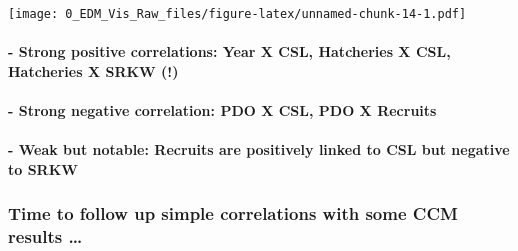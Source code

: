 \documentclass[]{article}
\let\oldparagraph\paragraph
\renewcommand{\paragraph}[1]{\oldparagraph{#1}\mbox{}}
\begin{document}
\texttt{[image: 0\_EDM\_Vis\_Raw\_files/figure-latex/unnamed-chunk-14-1.pdf]}

\hypertarget{strong-positive-correlations-year-x-csl-hatcheries-x-csl-hatcheries-x-srkw}{%
\paragraph{- Strong positive correlations: Year X CSL, Hatcheries X CSL,
Hatcheries X SRKW
(!)}\label{strong-positive-correlations-year-x-csl-hatcheries-x-csl-hatcheries-x-srkw}}

\hypertarget{strong-negative-correlation-pdo-x-csl-pdo-x-recruits}{%
\paragraph{- Strong negative correlation: PDO X CSL, PDO X
Recruits}\label{strong-negative-correlation-pdo-x-csl-pdo-x-recruits}}

\hypertarget{weak-but-notable-recruits-are-positively-linked-to-csl-but-negative-to-srkw}{%
\paragraph{- Weak but notable: Recruits are positively linked to CSL but
negative to
SRKW}\label{weak-but-notable-recruits-are-positively-linked-to-csl-but-negative-to-srkw}}

\hypertarget{time-to-follow-up-simple-correlations-with-some-ccm-results}{%
\subsubsection{Time to follow up simple correlations with some CCM
results
\ldots{}}\label{time-to-follow-up-simple-correlations-with-some-ccm-results}}
\end{document}
